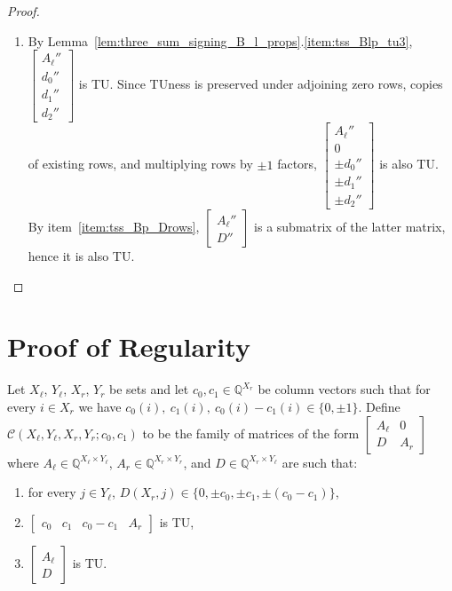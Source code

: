 \begin{proof}
\begin{enumerate}
        \item By Lemma~\ref{lem:three_sum_signing_B_l_props}.\ref{item:tss_Blp_tu3}, $\begin{bmatrix} A_{\ell}'' \\ d_{0}'' \\ d_{1}'' \\ d_{2}'' \end{bmatrix}$ is TU. Since TUness is preserved under adjoining zero rows, copies of existing rows, and multiplying rows by $\pm 1$ factors, $\begin{bmatrix} A_{\ell}'' \\ 0 \\ \pm d_{0}'' \\ \pm d_{1}'' \\ \pm d_{2}'' \end{bmatrix}$ is also TU. By item~\ref{item:tss_Bp_Drows}, $\begin{bmatrix} A_{\ell}'' \\ D'' \end{bmatrix}$ is a submatrix of the latter matrix, hence it is also TU.
    \end{enumerate}
\end{proof}


\section{Proof of Regularity}

\begin{definition}
    \label{MatrixLikeSum3}
    \leanok
    Let $X_{\ell}$, $Y_{\ell}$, $X_{r}$, $Y_{r}$ be sets and let $c_{0}, c_{1} \in \mathbb{Q}^{X_{r}}$ be column vectors such that for every $i \in X_{r}$ we have $c_{0} (i), \ c_{1} (i), \ c_{0} (i) - c_{1} (i) \in \{0, \pm 1\}$. Define $\mathcal{C} (X_{\ell}, Y_{\ell}, X_{r}, Y_{r}; c_{0}, c_{1})$ to be the family of matrices of the form $\begin{bmatrix} A_{\ell} & 0 \\ D & A_{r} \end{bmatrix}$ where $A_{\ell} \in \mathbb{Q}^{X_{\ell} \times Y_{\ell}}$, $A_{r} \in \mathbb{Q}^{X_{r} \times Y_{r}}$, and $D \in \mathbb{Q}^{X_{r} \times Y_{\ell}}$ are such that:
    \begin{enumerate}
        \item\label{item:tsl_cols} for every $j \in Y_{\ell}$, $D (X_{r}, j) \in \{0, \pm c_{0}, \pm c_{1}, \pm (c_{0} - c_{1})\}$,
        \item\label{item:tsl_bot} $\begin{bmatrix} c_{0} & c_{1} & c_{0} - c_{1} & A_{r} \end{bmatrix}$ is TU,
        \item\label{item:tsl_left} $\begin{bmatrix} A_{\ell} \\ D \end{bmatrix}$ is TU.
    \end{enumerate}
\end{definition}

